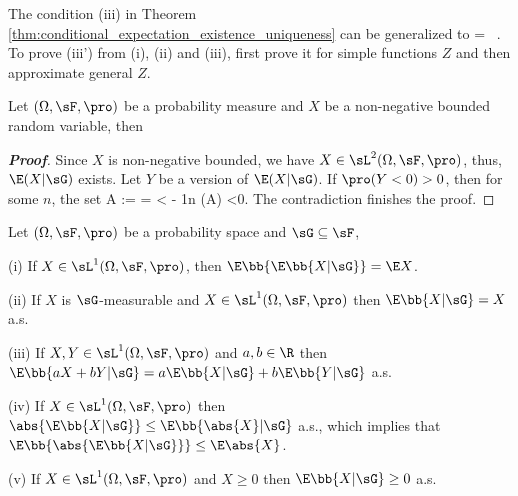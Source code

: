 \begin{remark}
The condition (iii) in Theorem \ref{thm:conditional_expectation_existence_uniqueness} can be generalized to
\be
{}\quad \E{} = \E{}\ .
\ee
To prove (iii') from (i), (ii) and (iii), first prove it for simple functions $Z$ and then approximate general $Z$.
\end{remark}

\begin{lemma}\label{lem:non_negative_bounded_conditional_expectation}
Let $(\Omega,\sF,\pro)$ be a probability measure and $X$ be a non-negative bounded random variable, then
\be
\E{} \quad \quad {}
\ee
\end{lemma}

\begin{proof}[\bf Proof]
Since $X$ is non-negative bounded, we have $X\in \sL^2(\Omega,\sF,\pro)$, thus, $\E(X|\sG)$ exists. Let $Y$ be a version of $\E(X|\sG)$. If $\pro(Y<0) >0$, then for some $n$, the set
\be
A := \in \sG \quad{} \quad\ra {} \leq \E{} = \E{} < - \frac 1n \pro(A) <0.
\ee
The contradiction finishes the proof.
\end{proof}

\begin{proposition}\label{pro:conditional_expectation_basic_property}
Let $(\Omega,\sF,\pro)$ be a probability space and $\sG \subseteq \sF$,
\ben
\item [(i)] If $X \in \sL^1(\Omega,\sF,\pro)$, then $\E\bb{\E\bb{X |\sG}} = \E X$.
\item [(ii)] If $X$ is $\sG$-measurable and $X \in \sL^1(\Omega,\sF,\pro)$ then $\E\bb{X |\sG} = X$ a.s.
\item [(iii)] If $X, Y \in \sL^1(\Omega,\sF,\pro)$ and $a, b \in \R$ then $\E\bb{aX + bY |\sG} = a\E\bb{X |\sG}+ b\E\bb{Y | \sG}$ a.s.
\item [(iv)] If $X \in \sL^1(\Omega,\sF,\pro)$ then $\abs{\E\bb{X |\sG}} \leq \E\bb{\abs{X}|\sG}$ a.s., which implies that $\E\bb{\abs{\E\bb{X |\sG}}} \leq \E\abs{X}$.
\item [(v)] If $X \in \sL^1(\Omega,\sF,\pro)$ and $X\geq 0$ then $\E\bb{X|\sG} \geq 0$ a.s.
\een
\end{proposition}

